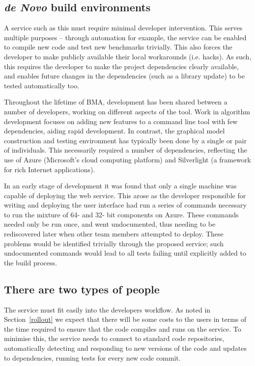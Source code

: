 \documentclass{llncs}
\begin{document}
\subsection{{\em de Novo} build environments}

A service such as this must require minimal developer intervention.
This serves multiple purposes -- through automation for example, the
service can be enabled to compile new code and test new benchmarks
trivially. This also forces the developer to make publicly available their
local workarounds (i.e. hacks). As such, this requires the developer to make
the project dependencies clearly available, and enables future changes
in the dependencies (such as a library update) to be tested
automatically too.

Throughout the lifetime of BMA, development has been shared between a
number of developers, working on different aspects of the tool. Work
in algorithm development focuses on adding new features to a command
line tool with few dependencies, aiding rapid development. In
contrast, the graphical model construction and testing environment has
typically been done by a single or pair of individuals.  This
necessarily required a number of dependencies, reflecting the use of
Azure (Microsoft's cloud computing platform) and Silverlight (a
framework for rich Internet applications).

In an early stage of development it was found that only a single
machine was capable of deploying the web service. This arose as the
developer responsible for writing and deploying the user interface had
run a series of commands necessary to run the mixture of 64- and 32-
bit components on Azure. These commands needed only be run once, and
went undocumented, thus needing to be rediscovered later when other
team members attempted to deploy.  These problems would be identified
trivially through the proposed service; such undocumented commands
would lead to all tests failing until explicitly added to the build
process.

\subsection{There are two types of people}

The service must fit easily into the developers workflow. As
noted in Section~\ref{rollout} we expect that there will be some costs
to the users in terms of the time required to ensure that the code
compiles and runs on the service. To minimise this, the service needs
to connect to standard code repositories, automatically detecting and
responding to new versions of the code and updates to dependencies,
running tests for every new code commit.
\end{document}
